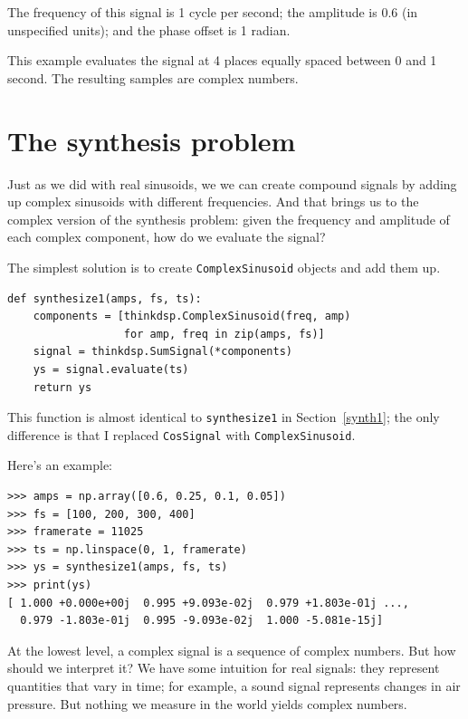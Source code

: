 \documentclass[12pt]{book}
\begin{document}
The frequency of this signal is 1 cycle per second; the amplitude
is 0.6 (in unspecified units); and the phase offset is 1 radian.

This example evaluates the signal at 4 places equally spaced between
0 and 1 second.  The resulting samples are complex numbers.


\section{The synthesis problem}

Just as we did with real sinusoids, we we can create compound signals
by adding up complex sinusoids with different frequencies.  And that
brings us to the complex version of the synthesis problem: given the
frequency and amplitude of each complex component, how do we evaluate the
signal?

The simplest solution is to create {\tt ComplexSinusoid} objects and
add them up.

\begin{verbatim}
def synthesize1(amps, fs, ts):
    components = [thinkdsp.ComplexSinusoid(freq, amp)
                  for amp, freq in zip(amps, fs)]
    signal = thinkdsp.SumSignal(*components)
    ys = signal.evaluate(ts)
    return ys
\end{verbatim}

This function is almost identical to {\tt synthesize1} in
Section~\ref{synth1}; the only difference is that I replaced
{\tt CosSignal} with {\tt ComplexSinusoid}.

Here's an example:

\begin{verbatim}
>>> amps = np.array([0.6, 0.25, 0.1, 0.05])
>>> fs = [100, 200, 300, 400]
>>> framerate = 11025
>>> ts = np.linspace(0, 1, framerate)
>>> ys = synthesize1(amps, fs, ts)
>>> print(ys)
[ 1.000 +0.000e+00j  0.995 +9.093e-02j  0.979 +1.803e-01j ...,
  0.979 -1.803e-01j  0.995 -9.093e-02j  1.000 -5.081e-15j]
\end{verbatim}

At the lowest level, a complex signal is a sequence of complex
numbers.  But how should we interpret it?  We have some intuition for
real signals: they represent quantities that vary in time; for
example, a sound signal represents changes in air pressure.
But nothing we measure in the world yields complex numbers.
\end{document}
